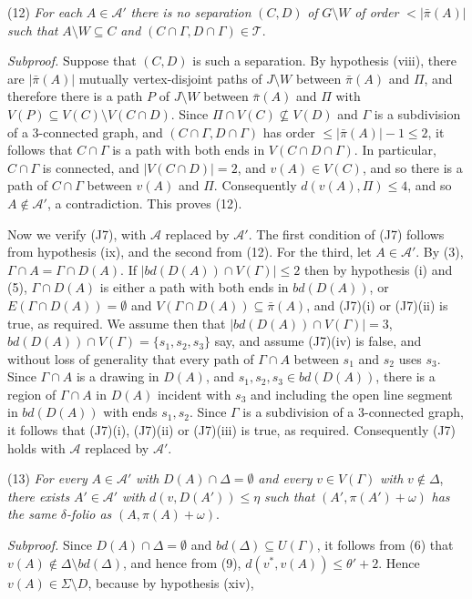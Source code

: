 \hspace*{12pt}(12) \textit{For each} $A \in \mathcal{A}'$ \textit{there is no separation} $(C, D)$ \textit{of} $G \setminus W$ \textit{of order} $< |\bar{\pi}(A)|$ \textit{such that} $A \setminus W \subseteq C$ \textit{and} $(C \cap \Gamma, D \cap \Gamma) \in \mathcal{T}$.

\textit{Subproof.} Suppose that $(C, D)$ is such a separation. By hypothesis (viii), there are $|\bar{\pi}(A)|$ mutually vertex-disjoint paths of $J \setminus W$ between $\bar{\pi}(A)$ and $\Pi$, and therefore there is a path $P$ of $J \setminus W$ between $\bar{\pi}(A)$ and $\Pi$ with $V(P) \subseteq V(C) \setminus V(C \cap D)$. Since $\Pi \cap V(C) \nsubseteq V(D)$ and $\Gamma$ is a subdivision of a 3-connected graph, and $(C \cap \Gamma, D \cap \Gamma)$ has order $\le |\bar{\pi}(A)| - 1 \le 2$, it follows that $C \cap \Gamma$ is a path with both ends in $V(C \cap D \cap \Gamma)$. In particular, $C \cap \Gamma$ is connected, and $|V(C \cap D)| = 2$, and $v(A) \in V(C)$, and so there is a path of $C \cap \Gamma$ between $v(A)$ and $\Pi$. Consequently $d(v(A), \Pi) \le 4$, and so $A \notin \mathcal{A}'$, a contradiction. This proves (12).

Now we verify (J7), with $\mathcal{A}$ replaced by $\mathcal{A}'$. The first condition of (J7) follows from hypothesis (ix), and the second from (12). For the third, let $A \in \mathcal{A}'$. By (3), $\Gamma \cap A = \Gamma \cap D(A)$. If $|bd(D(A)) \cap V(\Gamma)| \le 2$ then by hypothesis (i) and (5), $\Gamma \cap D(A)$ is either a path with both ends in $bd(D(A))$, or $E(\Gamma \cap D(A)) = \emptyset$ and $V(\Gamma \cap D(A)) \subseteq \bar{\pi}(A)$, and (J7)(i) or (J7)(ii) is true, as required. We assume then that $|bd(D(A)) \cap V(\Gamma)| = 3$, $bd(D(A)) \cap V(\Gamma) = \{s_1, s_2, s_3\}$ say, and assume (J7)(iv) is false, and without loss of generality that every path of $\Gamma \cap A$ between $s_1$ and $s_2$ uses $s_3$. Since $\Gamma \cap A$ is a drawing in $D(A)$, and $s_1, s_2, s_3 \in bd(D(A))$, there is a region of $\Gamma \cap A$ in $D(A)$ incident with $s_3$ and including the open line segment in $bd(D(A))$ with ends $s_1, s_2$. Since $\Gamma$ is a subdivision of a 3-connected graph, it follows that (J7)(i), (J7)(ii) or (J7)(iii) is true, as required. Consequently (J7) holds with $\mathcal{A}$ replaced by $\mathcal{A}'$.

\hspace*{12pt}(13) \textit{For every} $A \in \mathcal{A}'$ \textit{with} $D(A) \cap \Delta = \emptyset$ \textit{and every} $v \in V(\Gamma)$ \textit{with} $v \notin \Delta$, \textit{there exists} $A' \in \mathcal{A}'$ \textit{with} $d(v, D(A')) \le \eta$ \textit{such that} $(A', \pi(A') + \omega)$ \textit{has the same} $\delta$\textit{-folio as} $(A, \pi(A) + \omega)$.

\textit{Subproof.} Since $D(A) \cap \Delta = \emptyset$ and $bd(\Delta) \subseteq U(\Gamma)$, it follows from (6) that $v(A) \notin \Delta \setminus bd(\Delta)$, and hence from (9), $d(v^*, v(A)) \le \theta' + 2$. Hence $v(A) \in \Sigma \setminus D$, because by hypothesis (xiv),
